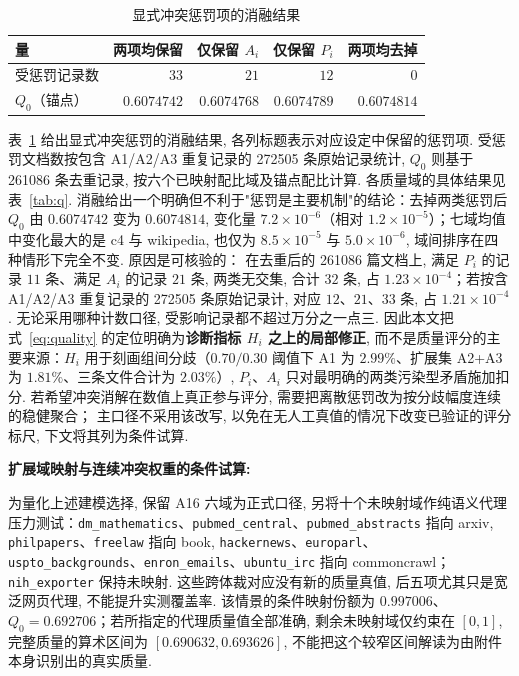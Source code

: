 \begin{table}[H]\centering\small
\caption{显式冲突惩罚项的消融结果}\label{tab:q1-penalty-ablation}
\begin{tabular}{lrrrr}\toprule
量 & 两项均保留 & 仅保留 $A_i$ & 仅保留 $P_i$ & 两项均去掉\\\midrule
受惩罚记录数 & $33$ & $21$ & $12$ & $0$\\
$Q_0$（锚点） & $0.6074742$ & $0.6074768$ & $0.6074789$ & $0.6074814$\\\bottomrule
\end{tabular}
\end{table}
表~\ref{tab:q1-penalty-ablation} 给出显式冲突惩罚的消融结果,  各列标题表示对应设定中保留的惩罚项. 受惩罚文档数按包含 A1/A2/A3 重复记录的 272505 条原始记录统计, $Q_0$ 则基于 261086 条去重记录,  按六个已映射配比域及锚点配比计算. 各质量域的具体结果见表~\ref{tab:q}.
消融给出一个明确但不利于"惩罚是主要机制"的结论：去掉两类惩罚后 $Q_0$ 由 $0.6074742$ 变为 $0.6074814$, 
变化量 $7.2\times10^{-6}$（相对 $1.2\times10^{-5}$）；七域均值中变化最大的是 c4 与 wikipedia, 
也仅为 $8.5\times10^{-5}$ 与 $5.0\times10^{-6}$, 域间排序在四种情形下完全不变. 原因是可核验的：
在去重后的 261086 篇文档上, 满足 $P_i$ 的记录 $11$ 条、满足 $A_i$ 的记录 $21$ 条, 两类无交集, 
合计 $32$ 条, 占 $1.23\times10^{-4}$；若按含 A1/A2/A3 重复记录的 272505 条原始记录计, 
对应 $12$、$21$、$33$ 条, 占 $1.21\times10^{-4}$. 无论采用哪种计数口径, 受影响记录都不超过万分之一点三. 
因此本文把式~\eqref{eq:quality} 的定位明确为\textbf{诊断指标 $H_i$ 之上的局部修正}, 
而不是质量评分的主要来源：$H_i$ 用于刻画组间分歧（$0.70/0.30$ 阈值下 A1 为 $2.99\%$、扩展集 A2+A3 为 $1.81\%$、三条文件合计为 $2.03\%$）, 
$P_i$、$A_i$ 只对最明确的两类污染型矛盾施加扣分. 若希望冲突消解在数值上真正参与评分, 
需要把离散惩罚改为按分歧幅度连续的稳健聚合；
主口径不采用该改写, 以免在无人工真值的情况下改变已验证的评分标尺, 下文将其列为条件试算.


\textbf{扩展域映射与连续冲突权重的条件试算: \quad}\label{par:q1-review-v44}

为量化上述建模选择, 保留 A16 六域为正式口径, 另将十个未映射域作纯语义代理压力测试：\texttt{dm\_mathematics}、\texttt{pubmed\_central}、\texttt{pubmed\_abstracts} 指向 arxiv, \texttt{philpapers}、\texttt{freelaw} 指向 book, \texttt{hackernews}、\texttt{europarl}、\texttt{uspto\_backgrounds}、\texttt{enron\_emails}、\texttt{ubuntu\_irc} 指向 commoncrawl；\texttt{nih\_exporter} 保持未映射. 这些跨体裁对应没有新的质量真值, 后五项尤其只是宽泛网页代理, 不能提升实测覆盖率. 该情景的条件映射份额为 $0.997006$、$Q_0=0.692706$；若所指定的代理质量值全部准确, 剩余未映射域仅约束在 $[0, 1]$, 完整质量的算术区间为 $[0.690632, 0.693626]$, 不能把这个较窄区间解读为由附件本身识别出的真实质量. 

